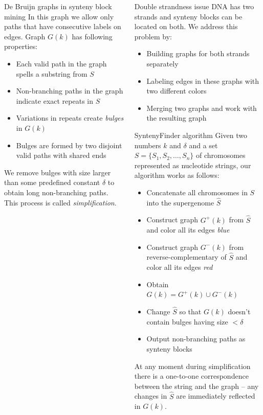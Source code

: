 \documentclass[final,hyperref={pdfpagelabels=false}]{beamer}
\begin{document}
\begin{frame}{}
\begin{columns}[t]
\begin{column}{0.32\linewidth}
\begin{block}{De Bruijn graphs in synteny block mining}
In this graph we allow only paths that have consecutive labels on edges.
Graph \(G(k)\) has following properties:

\begin{itemize}
\item Each valid path in the graph spells a substring from \(S\)
\item Non-branching paths in the graph indicate exact repeats in \(S\)
\item Variations in repeats create \textit{bulges} in \(G(k)\)
\item Bulges are formed by two disjoint valid paths with shared ends
\end{itemize}

We remove bulges with size larger than some predefined constant \(\delta\) to obtain long non-branching paths. This process is 
called \textit{simplification}.
\end{block}

\end{column}

\begin{column}{0.32\linewidth}

\begin{block}{Double strandness issue} \justifying
DNA has two strands and synteny blocks can be located on both. 
We address this problem by:
\begin{itemize}
\item Building graphs for both strands separately
\item Labeling edges in these graphs with two different colors
\item Merging two graphs and work with the resulting graph 
\end{itemize}
\end{block}

\begin{block}{SyntenyFinder algorithm} \justifying
Given two numbers \(k\) and \(\delta\) and a set \(S = \lbrace S_{1}, S_{2}, \ldots, S_{n} \rbrace \) of chromosomes 
represented as nucleotide strings, our algorithm works as follows:
\begin{itemize}
\item Concatenate all chromosomes in \(S\) into the supergenome \(\hat{S}\)
\item Construct graph \(G ^ +(k)\) from \(\hat{S}\) and color all its edges \textit{blue}
\item Construct graph \(G ^ -(k)\) from reverse-complementary of \(\hat{S}\) and color all its edges \textit{red}
\item Obtain \(G(k) = G ^ +(k) \cup G ^ -(k)\) 
\item Change \(\hat{S}\) so that \(G(k)\) doesn't contain bulges having size \( < \delta \)
\item Output non-branching paths as synteny blocks
\end{itemize}
At any moment during simplification there is a one-to-one correspondence between the string and the graph -- any changes in \(\hat{S}\) are immediately reflected in \(G(k)\).


\end{block}
\end{column}
\end{columns}
\end{frame}
\end{document}
